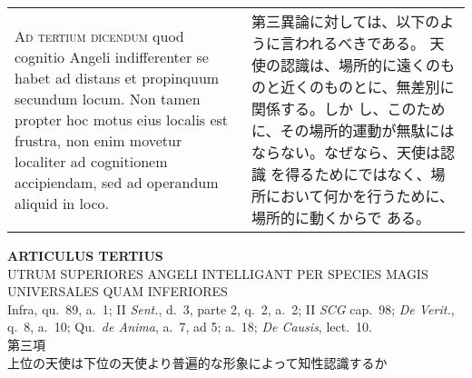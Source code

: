 \documentclass[10pt]{jsarticle} %
\begin{document}
\begin{longtable}{p{21em}p{21em}}
\\


{\scshape Ad tertium dicendum} quod cognitio Angeli indifferenter se
habet ad distans et propinquum secundum locum. Non tamen propter hoc
motus eius localis est frustra, non enim movetur localiter ad
cognitionem accipiendam, sed ad operandum aliquid in loco.

&


第三異論に対しては、以下のように言われるべきである。
天使の認識は、場所的に遠くのものと近くのものとに、無差別に関係する。しか
 し、このために、その場所的運動が無駄にはならない。なぜなら、天使は認識
 を得るためにではなく、場所において何かを行うために、場所的に動くからで
 ある。


\end{longtable}
\newpage


\begin{center}
 {\Large {\bf ARTICULUS TERTIUS}}\\
 {\large UTRUM SUPERIORES ANGELI INTELLIGANT PER SPECIES MAGIS UNIVERSALES QUAM INFERIORES}\\
 {\footnotesize Infra, qu.~89, a.~1; II {\itshape Sent.}, d.~3, parte 2, q.~2, a.~2; II {\itshape SCG} cap.~98; {\itshape De Verit.}, q.~8, a.~10; Qu.~{\itshape de Anima}, a.~7, ad 5; a.~18; {\itshape De Causis}, lect.~10.}\\
 {\Large 第三項\\上位の天使は下位の天使より普遍的な形象によって知性認識するか}
\end{center}
\end{document}
